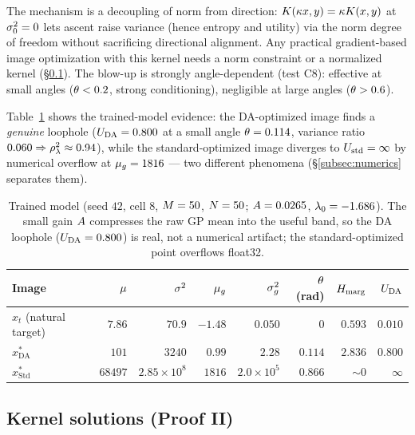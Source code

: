 \begin{remark}
The mechanism is a decoupling of norm from direction: $K(\kappa x,y)=\kappa K(x,y)$
at $\sigma_{0}^2=0$ lets ascent raise variance (hence entropy and utility) via the norm
degree of freedom without sacrificing directional alignment. Any practical
gradient-based image optimization with this kernel needs a norm constraint or a
normalized kernel (\S\ref{subsec:kernelfixes}). The blow-up is strongly
angle-dependent (test C8): effective at small angles ($\theta<0.2$, strong
conditioning), negligible at large angles ($\theta>0.6$).
\end{remark}

Table~\ref{tab:divevidence} shows the trained-model evidence: the DA-optimized
image finds a \emph{genuine} loophole ($U_{\mathrm{DA}}=0.800$ at a small angle
$\theta=0.114$, variance ratio $0.060\Rightarrow\rho_{\lambda}^2\approx0.94$), while the
standard-optimized image diverges to $U_{\mathrm{std}}=\infty$ by numerical
overflow at $\mu_{g}=1816$ --- two different phenomena
(\S\ref{subsec:numerics} separates them).

\begin{table}[t]\centering\small
\caption{Trained model (seed $42$, cell $8$, $M=50$, $N=50$; $A=0.0265$,
$\lambda_{0}=-1.686$). The small gain $A$ compresses the raw GP mean into the useful
band, so the DA loophole ($U_{\mathrm{DA}}=0.800$) is real, not a numerical artifact; the
standard-optimized point overflows float32.}
\label{tab:divevidence}
\begin{tabular}{lrrrrrrr}
\toprule
Image & $\mu$ & $\sigma^{2}$ & $\mu_{g}$ & $\sigma_{g}^{2}$ & $\theta$(rad) & $H_{\mathrm{marg}}$ & $U_{\mathrm{DA}}$\\
\midrule
$x_t$ (natural target) & $7.86$ & $70.9$ & $-1.48$ & $0.050$ & $0$ & $0.593$ & $0.010$\\
$x^*_{\mathrm{DA}}$ & $101$ & $3240$ & $0.99$ & $2.28$ & $0.114$ & $2.836$ & $0.800$\\
$x^*_{\mathrm{Std}}$ & $68497$ & $2.85\!\times\!10^{8}$ & $1816$ & $2.0\!\times\!10^{5}$ & $0.866$ & $\sim0$ & $\infty$\\
\bottomrule
\end{tabular}
\end{table}

\subsection{Kernel solutions (Proof II)}
\label{subsec:kernelfixes}

